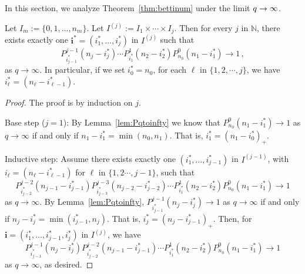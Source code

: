 In this section, we analyze Theorem~\ref{thm:bettinum} under the 
limit $q \rightarrow \infty$.

\begin{proposition}
  \label{prop:oneseq}
Let $I_m:= \{0,1,\ldots, n_m\}$.  Let $I^{(j)}:= I_1\times\cdots \times I_j$.
Then for every $j$ in $\mathbb{N}$, there exists exactly one $\mathbf{i}^\ast =
(i_1^\ast,\ldots, i_j^\ast)$ in $I^{(j)}$ such that 
\[
  P_{i_{j-1}^\ast}^{j-1}(n_j-i_j^\ast)\cdots
  P_{i_1^\ast}^1(n_2-i_2^\ast)P_{n_0}^0(n_1-i_1^\ast) \to 1 \, ,
\]
as $q\to\infty$. In particular, if we set $i_0^\ast = n_0$, for each $\ell$ in $\{1,2,\cdots, j\}$, we have $i_\ell^\ast = (n_\ell - i_{\ell - 1}^\ast)$.
\end{proposition}

\begin{proof}
The proof is by induction on $j$.

Base step ($j=1$): By Lemma~\ref{lem:Pqtoinfty} we know that $P_{n_0}^0 (n_1 - i_1^\ast) \to 1$ as $q\to\infty$ if and only if $n_1 - i_1^\ast = \min(n_0, n_1)$.  That is, $i_1^\ast = (n_1 - i_0^\ast)_+$.

Inductive step: Assume there exists exactly one $(i_1^\ast,\ldots , i_{j-1}^\ast)$ in $I^{(j-1)}$, with $i_\ell = (n_\ell - i_{\ell-1}^\ast)$ for $\ell$ in $\{1,2\cdots, j-1\}$, such that 
\[
P_{i_{j-2}^\ast}^{j-2}(n_{j-1} - i_{j-1}^\ast)P_{i_{j-3}^\ast}^{j-3}(n_{j-2} - i_{j-2}^\ast) \cdots P_{i_1^\ast}^1 (n_2 - i_2^\ast) P_{n_0}^0 (n_1 - i_1^\ast) \to 1
\]
as $q\to\infty$.  By Lemma~\ref{lem:Pqtoinfty}, $P_{i_{j-1}^\ast}^{j-1}(n_j - i_j^\ast) \to 1$ as $q \to \infty$ if and only if $n_j - i_j^\ast = \min(i_{j-1}^\ast, n_j)$. That is, $i_j^\ast = (n_j - i_{j-1}^\ast)_+$.  Then, for $\mathbf{i} = (i_1^\ast,\ldots, i_{j-1}^\ast, i_j^\ast)$ in $I^{(j)}$, we have
\[
P_{i_{j-1}^\ast}^{j-1}(n_j-i_j^\ast)P_{i_{j-2}^\ast}^{j-2}(n_{j-1}-i_{j-1}^\ast)\cdots P_{i_1^\ast}^1(n_2-i_2^\ast)P_{n_0}^0(n_1-i_1^\ast) \to 1
\]
as $q\to\infty$, as desired.
\end{proof}

